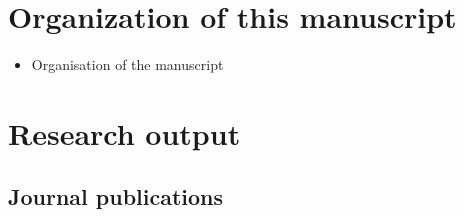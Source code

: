 \documentclass[
  11pt,
  twoside]{scrbook}
\providecommand{\tightlist}{%
  \setlength{\itemsep}{0pt}\setlength{\parskip}{0pt}}
\begin{document}
\hypertarget{organization-of-this-manuscript}{%
\section*{Organization of this manuscript}\label{organization-of-this-manuscript}}

\begin{itemize}
\tightlist
\item
  Organisation of the manuscript
\end{itemize}

\hypertarget{research-output}{%
\section*{Research output}\label{research-output}}

\hypertarget{journal-publications}{%
\subsection*{Journal publications}\label{journal-publications}}
\end{document}

